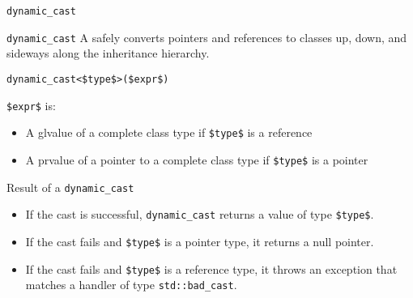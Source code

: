 \begin{frame}{\texttt{dynamic\_cast}}{}
  \begin{block}{\texttt{dynamic\_cast}}
    A  safely converts pointers and references to classes up, down, and sideways along the inheritance hierarchy.

    {
      \hfill\lstinline[mathescape]!dynamic_cast<$type$>($expr$)!\hfill
    }

    \lstinline[mathescape]!$expr$! is:
    \begin{itemize}
    \item
      A glvalue of a complete class type if \lstinline[mathescape]!$type$! is a reference
    \item
      A prvalue of a pointer to a complete class type if \lstinline[mathescape]!$type$! is a pointer
    \end{itemize}
  \end{block}

  \begin{block}{Result of a \texttt{dynamic\_cast}}
    \begin{itemize}
    \item
      If the cast is successful, \lstinline!dynamic_cast! returns a value of type \lstinline[mathescape]!$type$!.
    \item
      If the cast fails and \lstinline[mathescape]!$type$! is a pointer type, it returns a null pointer.
    \item
      If the cast fails and \lstinline[mathescape]!$type$! is a reference type, it throws an exception that matches a handler of type \lstinline!std::bad_cast!.
    \end{itemize}
  \end{block}
\end{frame}


